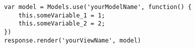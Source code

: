 

\lstset{language=C}

\begin{lstlisting}[frame=single]
var model = Models.use('yourModelName', function() {
	this.someVariable_1 = 1;
	this.someVariable_2 = 2;
})
response.render('yourViewName', model)
\end{lstlisting}